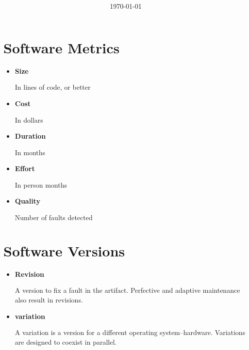 \documentclass[11pt]{article}
\title{\textbf{\Topic}}
\author{\Name}
\date{\today}
\begin{document}
\maketitle
\noindent\makebox[\linewidth]{\rule[8pt]{5in}{0.5pt}}

\section*{Software Metrics}

\begin{itemize}

	\item \textbf{Size}

	In lines of code, or better
	
	\item \textbf{Cost}
	
	In dollars
	
	\item \textbf{Duration}
	
	In months
	
	\item \textbf{Effort}
	
	In person months
	
	\item \textbf{Quality}
	
	Number of faults detected

\end{itemize}

\section*{Software Versions}

\begin{itemize}

	\item \textbf{Revision}

	A version to fix a fault in the artifact. Perfective and adaptive maintenance also result in revisions.
	
	\item \textbf{variation}
	
	A variation is a version for a different operating system–hardware. Variations are designed to coexist in parallel.

\end{itemize}
\end{document}

